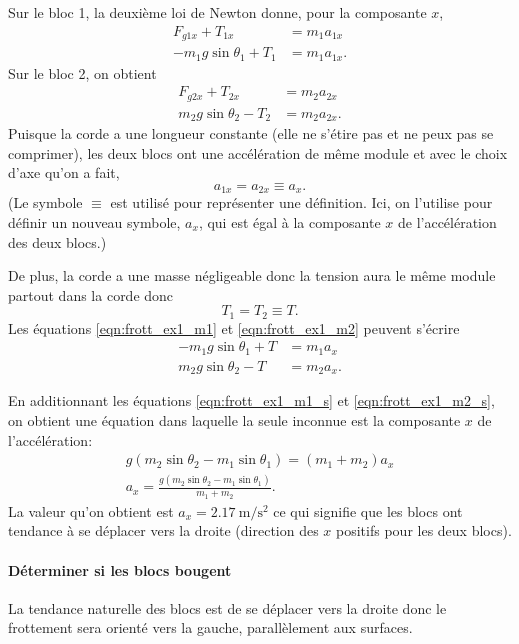 \documentclass{tufte-handout}
\begin{document}
Sur le bloc 1, la deuxième loi de Newton donne, pour la composante $x$,
\begin{align}
  F_{g1x} + T_{1x} &= m_1a_{1x} \nonumber \\
  -m_1g \sin\theta_1 + T_{1} &= m_1a_{1x}.  \label{eqn:frott_ex1_m1}
\end{align}
Sur le bloc 2, on obtient
\begin{align}
  F_{g2x} + T_{2x} &= m_2a_{2x} \nonumber\\
  m_2g \sin\theta_2 - T_{2} &= m_2a_{2x}.  \label{eqn:frott_ex1_m2}
\end{align}
Puisque la corde a une longueur constante (elle ne s'étire pas et ne peux pas
se comprimer), les deux blocs ont une accélération de même module et avec le
choix d'axe qu'on a fait,
\[
  a_{1x} = a_{2x} \equiv a_x.
\]
(Le symbole $\equiv$ est utilisé pour représenter une définition.  Ici, on
l'utilise pour définir un nouveau symbole, $a_x$, qui est égal à la composante
$x$ de l'accélération des deux blocs.)

De plus, la corde a une masse négligeable donc la tension aura le même module
partout dans la corde donc
\[
  T_1 = T_2 \equiv T.
\]
Les équations \ref{eqn:frott_ex1_m1} et \ref{eqn:frott_ex1_m2} peuvent s'écrire
\begin{align}
  -m_1g \sin\theta_1 + T &= m_1a_{x}  \label{eqn:frott_ex1_m1_s} \\
  m_2g \sin\theta_2 - T &= m_2a_{x}.  \label{eqn:frott_ex1_m2_s}
\end{align}

En additionnant les équations \ref{eqn:frott_ex1_m1_s} et
\ref{eqn:frott_ex1_m2_s},
on obtient une équation dans laquelle la seule inconnue est la composante $x$
de l'accélération:
\begin{align*}
  g(m_2\sin\theta_2 - m_1 \sin\theta_1) = (m_1 + m_2) a_x \\
  a_x = \frac{g(m_2\sin\theta_2 - m_1 \sin\theta_1)}{m_1 + m_2}.
\end{align*}
La valeur qu'on obtient est $a_x = \SI{2.17}{\meter\per\second\squared}$ ce qui
signifie que les blocs ont tendance à se déplacer vers la droite (direction des
$x$ positifs pour les deux blocs).

\paragraph{Déterminer si les blocs bougent}

La tendance naturelle des blocs est de se déplacer vers la droite donc le
frottement sera orienté vers la gauche, parallèlement aux surfaces.
\end{document}

